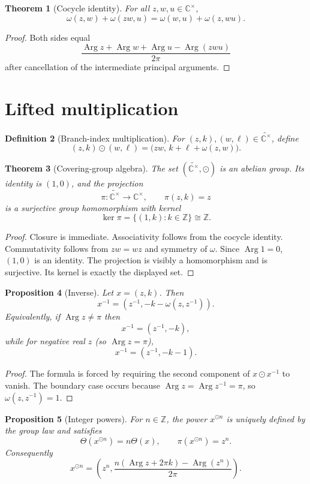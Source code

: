 \documentclass[11pt]{article}
\newtheorem{theorem}{Theorem}[section]
\newtheorem{proposition}[theorem]{Proposition}
\newtheorem{definition}[theorem]{Definition}
\newcommand{\C}{\mathbb C}
\newcommand{\Z}{\mathbb Z}
\newcommand{\Argp}{\operatorname{Arg}}
\newcommand{\wtC}{\widetilde{\C^{\times}}}
\begin{document}
\begin{theorem}[Cocycle identity]
For all $z,w,u\in\C^{\times}$,
\[
\omega(z,w)+\omega(zw,u)
=
\omega(w,u)+\omega(z,wu).
\]
\end{theorem}

\begin{proof}
Both sides equal
\[
\frac{\Argp z+\Argp w+\Argp u-\Argp(zwu)}{2\pi}
\]
after cancellation of the intermediate principal arguments.
\end{proof}

\section{Lifted multiplication}

\begin{definition}[Branch-index multiplication]
For $(z,k),(w,\ell)\in\wtC$, define
\[
(z,k)\odot(w,\ell)
=
\bigl(zw,\,k+\ell+\omega(z,w)\bigr).
\]
\end{definition}

\begin{theorem}[Covering-group algebra]
The set $(\wtC,\odot)$ is an abelian group.  Its identity is $(1,0)$, and the projection
\[
\pi:\wtC\to\C^{\times},\qquad \pi(z,k)=z
\]
is a surjective group homomorphism with kernel
\[
\ker\pi=\{(1,k):k\in\Z\}\cong\Z.
\]
\end{theorem}

\begin{proof}
Closure is immediate.  Associativity follows from the cocycle identity.  Commutativity follows from $zw=wz$ and symmetry of $\omega$.  Since $\Argp 1=0$, $(1,0)$ is an identity.  The projection is visibly a homomorphism and is surjective.  Its kernel is exactly the displayed set.
\end{proof}

\begin{proposition}[Inverse]
Let $x=(z,k)$.  Then
\[
x^{-1}=
\left(z^{-1},-k-\omega(z,z^{-1})\right).
\]
Equivalently, if $\Argp z\ne\pi$ then
\[
x^{-1}=(z^{-1},-k),
\]
while for negative real $z$ (so $\Argp z=\pi$),
\[
x^{-1}=(z^{-1},-k-1).
\]
\end{proposition}

\begin{proof}
The formula is forced by requiring the second component of $x\odot x^{-1}$ to vanish.  The boundary case occurs because $\Argp z=\Argp z^{-1}=\pi$, so $\omega(z,z^{-1})=1$.
\end{proof}

\begin{proposition}[Integer powers]
For $n\in\Z$, the power $x^{\odot n}$ is uniquely defined by the group law and satisfies
\[
\Theta(x^{\odot n})=n\Theta(x),
\qquad
\pi(x^{\odot n})=z^n.
\]
Consequently
\[
x^{\odot n}
=
\left(z^n,\frac{n(\Argp z+2\pi k)-\Argp(z^n)}{2\pi}\right).
\]
\end{proposition}
\end{document}

